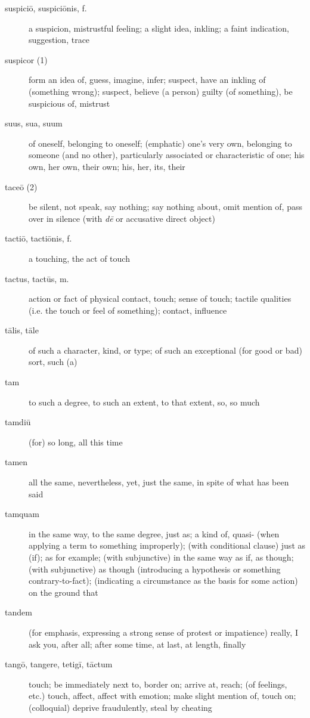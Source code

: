 \begin{description}
    \item[suspiciō, suspiciōnis, f.] a suspicion, mistrustful feeling; a slight idea, inkling; a faint indication, suggestion, trace
    \item[suspicor (1)] form an idea of, guess, imagine, infer; suspect, have an inkling of (something wrong); suspect, believe (a person) guilty (of something), be suspicious of, mistrust
    \item[suus, sua, suum] of oneself, belonging to oneself; (emphatic) one's very own, belonging to someone (and no other), particularly associated or characteristic of one; his own, her own, their own; his, her, its, their
    \item[taceō (2)] be silent, not speak, say nothing; say nothing about, omit mention of, pass over in silence (with \textit{dē} or accusative direct object)
    \item[tactiō, tactiōnis, f.] a touching, the act of touch
    \item[tactus, tactūs, m.] action or fact of physical contact, touch; sense of touch; tactile qualities (i.e. the touch or feel of something); contact, influence
    \item[tālis, tāle] of such a character, kind, or type; of such an exceptional (for good or bad) sort, such (a)
    \item[tam] to such a degree, to such an extent, to that extent, so, so much
    \item[tamdiū] (for) so long, all this time
    \item[tamen] all the same, nevertheless, yet, just the same, in spite of what has been said
    \item[tamquam] in the same way, to the same degree, just as; a kind of, quasi- (when applying a term to something improperly); (with conditional clause) just as (if); as for example; (with subjunctive) in the same way as if, as though; (with subjunctive) as though (introducing a hypothesis or something contrary-to-fact); (indicating a circumstance as the basis for some action) on the ground that
    \item[tandem] (for emphasis, expressing a strong sense of protest or impatience) really, I ask you, after all; after some time, at last, at length, finally
    \item[tangō, tangere, tetigī, tāctum] touch; be immediately next to, border on; arrive at, reach; (of feelings, etc.) touch, affect, affect with emotion; make slight mention of, touch on; (colloquial) deprive fraudulently, steal by cheating

\end{description}

